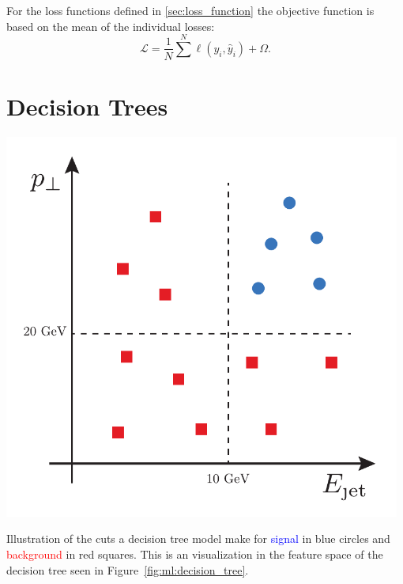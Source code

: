 \documentclass[a4paper, twoside, nobib]{tufte-book}
\begin{document}
For the loss functions defined in \autoref{sec:loss_function} the objective function is based on the mean of the individual losses:
\begin{equation}
  \mathcal{L} = \frac{1}{N} \sum^N \ell(y_i, \hat{y}_i) + \Omega. 
\end{equation}

\section{Decision Trees}
\label{sec:ml:decision_trees}

\begin{marginfigure}[-3cm]
  \includegraphics[width=0.98\textwidth]{figures/decision_tree/tree_example.pdf}%
  \caption[Decision Tree Cuts]{Illustration of the cuts a decision tree model make for \textcolor{blue}{signal} in blue circles and \textcolor{red}{background} in red squares. This is an visualization in the feature space of the decision tree seen in Figure~\ref{fig:ml:decision_tree}.}
  \label{fig:ml:decision_tree_feature_space}
\end{marginfigure}
\end{document}
